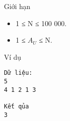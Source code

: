 Giới hạn
\begin{itemize}
	\item     1 ≤ N ≤ 100 000.   
	\item     1 ≤ $A_{U}$    ≤ N.   
\end{itemize}
Ví dụ
\begin{verbatim}
Dữ liệu:
5
4 1 2 1 3

Kết qủa
3
\end{verbatim}